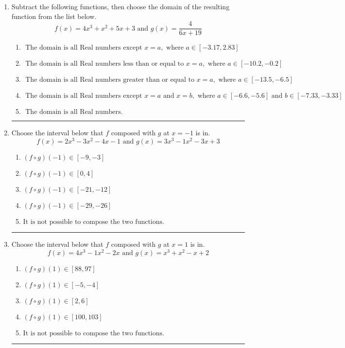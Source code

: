 \documentclass[14pt]{extbook}
\newcommand{\litem}[1]{\item#1\hspace*{-1cm}\rule{\textwidth}{0.4pt}}
\begin{document}
\begin{enumerate}
\litem{
Subtract the following functions, then choose the domain of the resulting function from the list below.\[ f(x) = 4x^{3} + x^{2} +5 x + 3 \text{ and } g(x) = \frac{4}{6x+19} \]\begin{enumerate}[label=\Alph*.]
\item \( \text{ The domain is all Real numbers except } x = a, \text{ where } a \in [-3.17, 2.83] \)
\item \( \text{ The domain is all Real numbers less than or equal to } x = a, \text{ where } a \in [-10.2, -0.2] \)
\item \( \text{ The domain is all Real numbers greater than or equal to } x = a, \text{ where } a \in [-13.5, -6.5] \)
\item \( \text{ The domain is all Real numbers except } x = a \text{ and } x = b, \text{ where } a \in [-6.6, -5.6] \text{ and } b \in [-7.33, -3.33] \)
\item \( \text{ The domain is all Real numbers. } \)

\end{enumerate} }
\litem{
Choose the interval below that $f$ composed with $g$ at $x=-1$ is in.\[ f(x) = 2x^{3} -3 x^{2} -4 x -1 \text{ and } g(x) = 3x^{3} -1 x^{2} -3 x + 3 \]\begin{enumerate}[label=\Alph*.]
\item \( (f \circ g)(-1) \in [-9, -3] \)
\item \( (f \circ g)(-1) \in [0, 4] \)
\item \( (f \circ g)(-1) \in [-21, -12] \)
\item \( (f \circ g)(-1) \in [-29, -26] \)
\item \( \text{It is not possible to compose the two functions.} \)

\end{enumerate} }
\litem{
Choose the interval below that $f$ composed with $g$ at $x=1$ is in.\[ f(x) = 4x^{3} -1 x^{2} -2 x \text{ and } g(x) = x^{3} + x^{2} -x + 2 \]\begin{enumerate}[label=\Alph*.]
\item \( (f \circ g)(1) \in [88, 97] \)
\item \( (f \circ g)(1) \in [-5, -4] \)
\item \( (f \circ g)(1) \in [2, 6] \)
\item \( (f \circ g)(1) \in [100, 103] \)
\item \( \text{It is not possible to compose the two functions.} \)


\end{enumerate}}
\end{enumerate}
\end{document}
